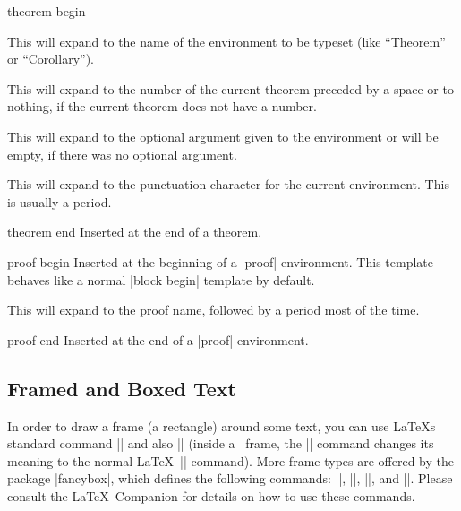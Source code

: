 \begin{element}{theorem begin}
\begin{itemize}
    \iteminsert{\inserttheoremname}
    This will expand to the name of the environment to be typeset (like ``Theorem'' or ``Corollary'').

    \iteminsert{\inserttheoremnumber}
    This will expand to the number of the current theorem preceded by a space or to nothing, if the current theorem does not have a number.

    \iteminsert{\inserttheoremaddition}
    This will expand to the optional argument given to the environment or will be empty, if there was no optional argument.

    \iteminsert{\inserttheorempunctuation}
    This will expand to the punctuation character for the current environment. This is usually a period.
  \end{itemize}
\end{element}

\begin{element}{theorem end}\yes\no\no
  Inserted at the end of a theorem.
\end{element}

\begin{element}{proof begin}\yes\no\no
  Inserted at the beginning of a |proof| environment. This template behaves like a normal |block begin| template by default.

  \begin{itemize}
    \iteminsert{\insertproofname}
    This will expand to the proof name, followed by a period most of the time.
  \end{itemize}
\end{element}

\begin{element}{proof end}\yes\no\no
  Inserted at the end of a |proof| environment.
\end{element}

\subsection{Framed and Boxed Text}

In order to draw a frame (a rectangle) around some text, you can use \LaTeX s standard command |\fbox| and also |\frame| (inside a \beamer\ frame, the |\frame| command changes its meaning to the normal \LaTeX\ |\frame| command). More frame types are offered by the package |fancybox|, which defines the following commands: |\shadowbox|, |\doublebox|, |\ovalbox|, and |\Ovalbox|. Please consult the \LaTeX\ Companion for details on how to use these commands.

